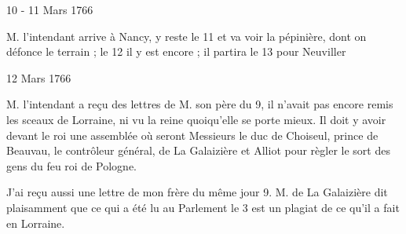                      \begin{diary}{10 - 11 Mars 1766}{}


                           M. l'intendant arrive à Nancy, y reste
                           le 11 et va voir la pépinière, dont on
                           défonce le terrain ; le 12 il y est
                           encore ;
                           il partira le 13 pour Neuviller
                        \bigskip


                     \end{diary}

                     \begin{diary}{12 Mars 1766}{}


                           M. l'intendant a reçu des lettres
                           de M.
                              son père du 9, il
                           n'avait pas encore remis
                           les sceaux de Lorraine, ni
                           vu la reine
                           quoiqu'elle se porte mieux. Il doit y avoir
                           devant le roi une assemblée où
                           seront Messieurs
                           le duc de Choiseul, prince de Beauvau,
                           le contrôleur général, de La
                              Galaizière et
                           Alliot pour règler le sort des
                           gens du
                           feu roi de Pologne.
                        \bigskip


                         J'ai reçu aussi une lettre de mon
                              frère
                           du même jour 9. M. de La Galaizière dit
                           plaisamment que ce qui a été lu au
                           Parlement
                           le 3 est un plagiat de ce qu'il
                           a fait en Lorraine. \bigskip


                     \end{diary}

